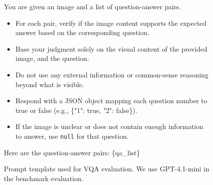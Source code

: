 
\begin{figure}[!t]
    \centering
    \begin{tcolorbox}[
      colback=white,
      colframe=gray!70,
      title={\small\bfseries VQA Prompt Template},
      colbacktitle=gray!10,
      coltitle=black,
      fontupper=\small,
      enhanced,
      left=2mm,
      right=2mm,
      boxrule=0.4pt,
      arc=1mm
    ]
    You are given an image and a list of question-answer pairs. \\
    \begin{itemize}[nosep,leftmargin=*]
      \item For each pair, verify if the image content supports the expected answer based on the corresponding question.\\
      \item Base your judgment solely on the visual content of the provided image, and the question.\\
      \item Do not use any external information or common-sense reasoning beyond what is visible.\\
      \item Respond with a JSON object mapping each question number to true or false (e.g., \{"1": true, "2": false\}).\\
      \item If the image is unclear or does not contain enough information to answer, use \texttt{null} for that question.\\
    \end{itemize}
    Here are the question-answer pairs: \{qa\_list\}
    \end{tcolorbox}
    \caption{Prompt template used for VQA evaluation. We use GPT-4.1-mini in the benchmark evaluation.}
    \label{fig:vqa_prompt_template}
\end{figure}